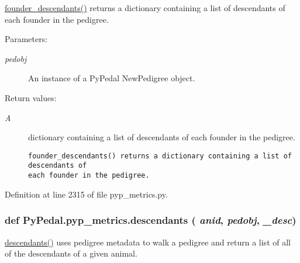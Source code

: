 \hyperlink{namespacePyPedal_1_1pyp__metrics_8bb9c8d14721828c6d87bcd0d4e24658}{founder\_\-descendants()} returns a dictionary containing a list of descendants of each founder in the pedigree. 

\begin{Desc}
\item[Parameters:]
\begin{description}
\item[{\em pedobj}]An instance of a Py\-Pedal New\-Pedigree object. \end{description}
\end{Desc}
\begin{Desc}
\item[Return values:]
\begin{description}
\item[{\em A}]dictionary containing a list of descendants of each founder in the pedigree.

\footnotesize\begin{verbatim}founder_descendants() returns a dictionary containing a list of descendants of
each founder in the pedigree.
\end{verbatim}
\normalsize
 \end{description}
\end{Desc}


Definition at line 2315 of file pyp\_\-metrics.py.\hypertarget{namespacePyPedal_1_1pyp__metrics_132a4b6580f08cb10db3b376849a2bfe}{
\subsubsection[descendants]{\setlength{\rightskip}{0pt plus 5cm}def Py\-Pedal.pyp\_\-metrics.descendants ( {\em anid},  {\em pedobj},  {\em \_\-desc})}}
\label{namespacePyPedal_1_1pyp__metrics_132a4b6580f08cb10db3b376849a2bfe}


\hyperlink{namespacePyPedal_1_1pyp__metrics_132a4b6580f08cb10db3b376849a2bfe}{descendants()} uses pedigree metadata to walk a pedigree and return a list of all of the descendants of a given animal. 

